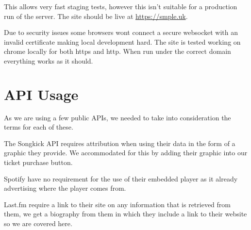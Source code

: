 \documentclass[10pt]{article}
\begin{document}
        This allows very fast staging tests, however this isn't suitable for a production run of the server. The site should be live at \href{https://smple.uk}{https://smple.uk}.

        Due to security issues some browsers wont connect a secure websocket with an invalid certificate making local development hard. The site is tested working on chrome locally for both https and http. When run under the correct domain everything works as it should.

    \section{API Usage}
        As we are using a few public APIs, we needed to take into consideration the terms for each of these.

        The Songkick API requires attribution when using their data in the form of a graphic they provide. We accommodated for this by adding their graphic into our ticket purchase button.

        Spotify have no requirement for the use of their embedded player as it already advertising where the player comes from.

        Last.fm require a link to their site on any information that is retrieved from them, we get a biography from them in which they include a link to their website so we are covered here.
\end{document}

